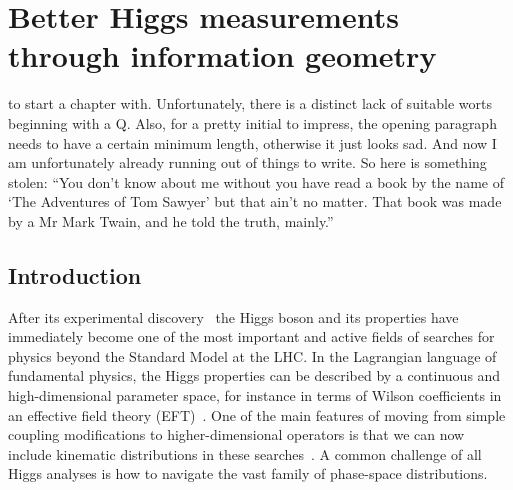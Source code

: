  




\chapter{Better Higgs measurements through information geometry}
\label{chapter:information}

 to start a chapter
with. Unfortunately, there is a distinct lack of suitable worts
beginning with a Q. Also, for a pretty initial to impress, the opening
paragraph needs to have a certain minimum length, otherwise it just
looks sad. And now I am unfortunately already running out of things to
write. So here is something stolen: ``You don't know about me without you
have read a book by the name of `The Adventures of Tom Sawyer' but
that ain't no matter. That book was made by a Mr Mark Twain, and he
told the truth, mainly.''


\section{Introduction}
\label{sec:information_intro}

After its experimental discovery~\cite{higgs,discovery} the Higgs
boson and its properties have immediately become one of the most
important and active fields of searches for physics beyond the
Standard Model at the LHC.  In the Lagrangian language of fundamental
physics, the Higgs properties can be described by a continuous and
high-dimensional parameter space, for instance in terms of Wilson
coefficients in an effective field theory
(EFT)~\cite{eftfoundations,eftorig,eftreviews}. One of the main
features of moving from simple coupling modifications to
higher-dimensional operators is that we can now include kinematic
distributions in these searches~\cite{higgs_fit,yr4}. A common
challenge of all Higgs analyses is how to navigate the vast family of
phase-space distributions.

